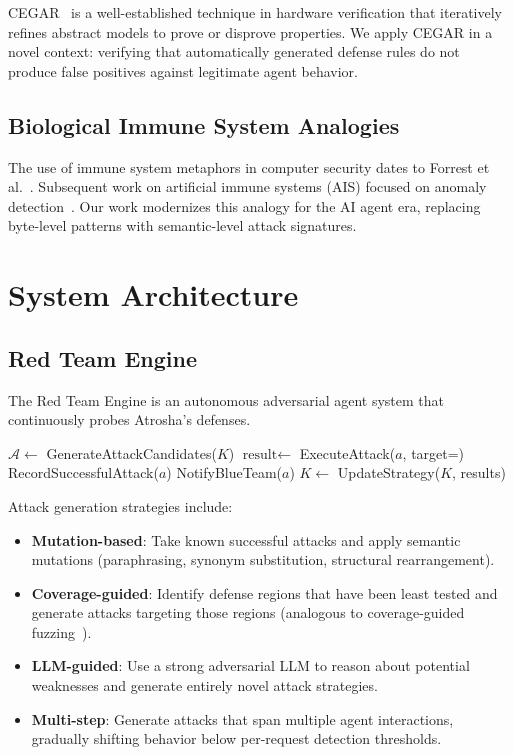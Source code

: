\documentclass[conference]{IEEEtran}
\begin{document}
CEGAR~\cite{clarke2000} is a well-established technique in hardware verification that iteratively refines abstract models to prove or disprove properties. We apply CEGAR in a novel context: verifying that automatically generated defense rules do not produce false positives against legitimate agent behavior.

\subsection{Biological Immune System Analogies}

The use of immune system metaphors in computer security dates to Forrest et al.~\cite{forrest1994}. Subsequent work on artificial immune systems (AIS) focused on anomaly detection~\cite{dasgupta2011}. Our work modernizes this analogy for the AI agent era, replacing byte-level patterns with semantic-level attack signatures.

\section{System Architecture}

\subsection{Red Team Engine}

The Red Team Engine is an autonomous adversarial agent system that continuously probes Atrosha's defenses.

\begin{algorithm}
\caption{Red Team Attack Generation}
\begin{algorithmic}[1]
\LOOP
    \STATE $\mathcal{A} \leftarrow$ GenerateAttackCandidates($K$)
        \STATE $\text{result} \leftarrow$ ExecuteAttack($a$, target=)
            \STATE RecordSuccessfulAttack($a$)
            \STATE NotifyBlueTeam($a$)
        \ENDIF
    \ENDFOR
    \STATE $K \leftarrow$ UpdateStrategy($K$, results)
\ENDLOOP
\end{algorithmic}
\end{algorithm}

Attack generation strategies include:
\begin{itemize}
    \item \textbf{Mutation-based}: Take known successful attacks and apply semantic mutations (paraphrasing, synonym substitution, structural rearrangement).
    \item \textbf{Coverage-guided}: Identify defense regions that have been least tested and generate attacks targeting those regions (analogous to coverage-guided fuzzing~\cite{aflplusplus}).
    \item \textbf{LLM-guided}: Use a strong adversarial LLM to reason about potential weaknesses and generate entirely novel attack strategies.
    \item \textbf{Multi-step}: Generate attacks that span multiple agent interactions, gradually shifting behavior below per-request detection thresholds.
\end{itemize}
\end{document}
